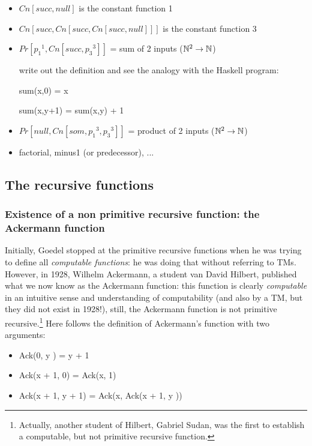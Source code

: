 \begin{itemize}
\item 
$Cn[succ,null]$ is the constant function 1

\item 
$Cn[succ,Cn[succ,Cn[succ,null]]]$ is the constant function 3

\item 
$Pr[{p_1}^1,Cn[succ,{p_3}^3]]$ = sum of 2 inputs ($\mathbb{N}^2 \rightarrow \mathbb{N}$)

write out the definition and see the analogy with the Haskell program:

sum(x,0) = x

sum(x,y+1) = sum(x,y) + 1


\item 

$Pr[null,Cn[som,{p_1}^3, {p_3}^3]]$ = product of 2 inputs ($\mathbb{N}^2 \rightarrow \mathbb{N}$)

\item 
factorial, minus1 (or predecessor), ...

\end{itemize}





\subsection{The recursive functions}

\subsubsection{Existence of a non primitive recursive function: the Ackermann function}

Initially, Goedel stopped at the primitive recursive functions when he
was trying to define all {\em computable functions}: he was doing that
without referring to TMs. However, in 1928, Wilhelm Ackermann, a
student van David Hilbert, published what we now know as the Ackermann
function: this function is clearly {\em computable} in an intuitive
sense and understanding of computability (and also by a TM, but they
did not exist in 1928!), still, the Ackermann function is not
primitive recursive.\footnote{Actually, another student of Hilbert,
 Gabriel Sudan, was the first to establish a computable, but not
 primitive recursive function.} Here follows the definition of
Ackermann's function with two arguments:

\begin{itemize}
\item[] Ack(0, y ) = y + 1
\item[] Ack(x + 1, 0) = Ack(x, 1)
\item[] Ack(x + 1, y + 1) = Ack(x, Ack(x + 1, y ))
\end{itemize}

